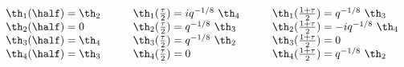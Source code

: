 \begin{equation}
  \begin{array}{lll}
  \th_1(\half)=\th_2 \qquad&
  \th_1(\frac{\tau}{2})=iq^{-1/8}~\th_4 \qquad &
  \th_1(\frac{1+\tau}{2})= q^{-1/8}~\th_3\\
  \th_2(\half)=0 \qquad&
  \th_2(\frac{\tau}{2})=q^{-1/8}~\th_3 \qquad &
  \th_2(\frac{1+\tau}{2})= -iq^{-1/8}~\th_4\\
  \th_3(\half)=\th_4 \qquad &
  \th_3(\frac{\tau}{2})=q^{-1/8}~\th_2 \qquad &
  \th_3(\frac{1+\tau}{2})= 0\\
  \th_4(\half)=\th_3 \qquad &
  \th_4(\frac{\tau}{2})=0 \qquad &
  \th_4(\frac{1+\tau}{2})= q^{-1/8}~\th_2\\
  \end{array}
\end{equation}

